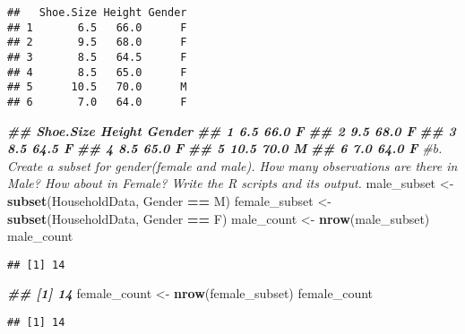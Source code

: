 \documentclass[
]{article}
\newenvironment{Shaded}{\begin{snugshade}}{\end{snugshade}}
\newcommand{\CommentTok}[1]{\textcolor[rgb]{0.56,0.35,0.01}{\textit{#1}}}
\newcommand{\DocumentationTok}[1]{\textcolor[rgb]{0.56,0.35,0.01}{\textbf{\textit{#1}}}}
\newcommand{\FunctionTok}[1]{\textcolor[rgb]{0.13,0.29,0.53}{\textbf{#1}}}
\newcommand{\NormalTok}[1]{#1}
\newcommand{\OtherTok}[1]{\textcolor[rgb]{0.56,0.35,0.01}{#1}}
\newcommand{\SpecialCharTok}[1]{\textcolor[rgb]{0.81,0.36,0.00}{\textbf{#1}}}
\newcommand{\StringTok}[1]{\textcolor[rgb]{0.31,0.60,0.02}{#1}}
\begin{document}
\begin{verbatim}
##   Shoe.Size Height Gender
## 1       6.5   66.0      F
## 2       9.5   68.0      F
## 3       8.5   64.5      F
## 4       8.5   65.0      F
## 5      10.5   70.0      M
## 6       7.0   64.0      F
\end{verbatim}

\begin{Shaded}
\begin{Highlighting}[]
\DocumentationTok{\#\# Shoe.Size Height Gender}
\DocumentationTok{\#\# 1 6.5 66.0 F}
\DocumentationTok{\#\# 2 9.5 68.0 F}
\DocumentationTok{\#\# 3 8.5 64.5 F}
\DocumentationTok{\#\# 4 8.5 65.0 F}
\DocumentationTok{\#\# 5 10.5 70.0 M}
\DocumentationTok{\#\# 6 7.0 64.0 F}
\CommentTok{\#b. Create a subset for gender(female and male). How many observations are there in Male? How about in Female? Write the R scripts and its output.}
\NormalTok{male\_subset }\OtherTok{\textless{}{-}} \FunctionTok{subset}\NormalTok{(HouseholdData, Gender }\SpecialCharTok{==} \StringTok{\textquotesingle{}M\textquotesingle{}}\NormalTok{)}
\NormalTok{female\_subset }\OtherTok{\textless{}{-}} \FunctionTok{subset}\NormalTok{(HouseholdData, Gender }\SpecialCharTok{==} \StringTok{\textquotesingle{}F\textquotesingle{}}\NormalTok{)}
\NormalTok{male\_count }\OtherTok{\textless{}{-}} \FunctionTok{nrow}\NormalTok{(male\_subset)}
\NormalTok{male\_count}
\end{Highlighting}
\end{Shaded}

\begin{verbatim}
## [1] 14
\end{verbatim}

\begin{Shaded}
\begin{Highlighting}[]
\DocumentationTok{\#\# [1] 14}
\NormalTok{female\_count }\OtherTok{\textless{}{-}} \FunctionTok{nrow}\NormalTok{(female\_subset)}
\NormalTok{female\_count}
\end{Highlighting}
\end{Shaded}

\begin{verbatim}
## [1] 14
\end{verbatim}
\end{document}
